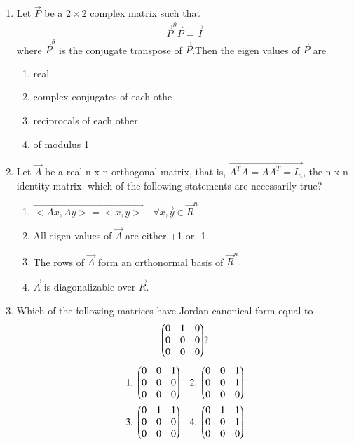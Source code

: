 \begin{enumerate}[label=\thesection.\arabic*.,ref=\thesection.\theenumi]
\begin{enumerate}
\end{enumerate}
%
%
\solution

\item Let $\vec{P}$ be a $2\times 2$ complex matrix such that
\begin{align}
\vec{P}^\theta \vec{P} =\vec{I}
\end{align}
where $\vec{P}^\theta$ is the conjugate transpose of $\vec{P}$.Then the eigen values of $\vec{P}$ are
\begin{enumerate}
\item{real}
\item{complex conjugates of each othe}
\item{reciprocals of each other}
\item{of modulus 1}
\end{enumerate}
%
%
\solution

\item Let $\vec A$ be a real n x n orthogonal matrix, that is, $\vec{A^TA=AA^T=I_n}$, the n x n identity matrix. which of the following statements are necessarily true?
\begin{enumerate}
    \item $ \vec{<Ax,Ay> =  <x,y>}\quad \forall \vec{x,y}\in \vec R^n $
    \item All eigen values of $\vec A $ are either +1 or -1.
    \item The rows of $\vec A$ form an orthonormal basis of $\vec R^n.$
    \item $\vec A$ is diagonalizable over $\vec R.$ 
\end{enumerate}
%
%
\solution

\item Which of the following matrices have Jordan canonical form equal to
\begin{align*}
        \begin{pmatrix}0&1&0\\0&0&0\\0&0&0\end{pmatrix}?
\end{align*}
\begin{align*}
    \mbox{1. }\myvec{0&0&1\\0&0&0\\0&0&0}&&\mbox{2. }\myvec{0&0&1\\0&0&1\\0&0&0}\\
    \mbox{3. }\myvec{0&1&1\\0&0&0\\0&0&0}&&\mbox{4. }\myvec{0&1&1\\0&0&1\\0&0&0}

\end{align*}
\end{enumerate}
